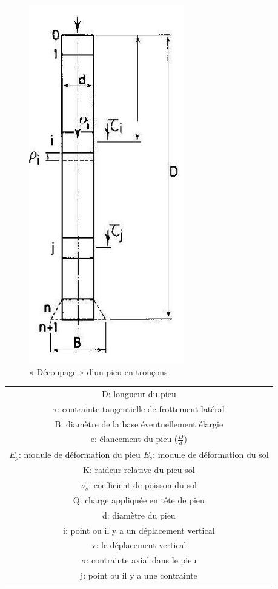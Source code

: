         \begin{multicols}{2}
        
        \begin{figure}[h!]
            \centering
            \includegraphics[scale=0.8]{Holeyman/images/H43.PNG}
            \caption{« Découpage » d’un pieu en tronçons }
        \end{figure}
        
        \begin{tabular}{|c} 
             D: longueur du pieu  \\
             $\tau$: contrainte tangentielle de frottement latéral \\
             B: diamètre de la base éventuellement élargie \\
             e: élancement du pieu ($\frac{D}{d}$) \\
             $E_p$: module de déformation du pieu 
             $E_s$: module de déformation du sol \\
             K: raideur relative du pieu-sol  \\
             $\nu_s$: coefficient de poisson du sol  \\
             Q: charge appliquée en tête de pieu  \\
             d: diamètre du pieu  \\
             i: point ou il y a un déplacement vertical  \\
             v: le déplacement vertical  \\
             $\sigma$: contrainte axial dans le pieu  \\
             j: point ou il y a une contrainte  
        \end{tabular}
        
        \end{multicols}
        
